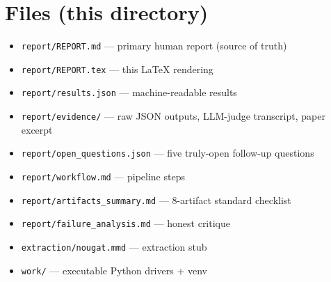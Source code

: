 \documentclass[11pt]{article}
\begin{document}
\section{Files (this directory)}
\begin{itemize}
\item \texttt{report/REPORT.md} --- primary human report (source of truth)
\item \texttt{report/REPORT.tex} --- this LaTeX rendering
\item \texttt{report/results.json} --- machine-readable results
\item \texttt{report/evidence/} --- raw JSON outputs, LLM-judge transcript, paper excerpt
\item \texttt{report/open\_questions.json} --- five truly-open follow-up questions
\item \texttt{report/workflow.md} --- pipeline steps
\item \texttt{report/artifacts\_summary.md} --- 8-artifact standard checklist
\item \texttt{report/failure\_analysis.md} --- honest critique
\item \texttt{extraction/nougat.mmd} --- extraction stub
\item \texttt{work/} --- executable Python drivers + venv
\end{itemize}


\end{document}
